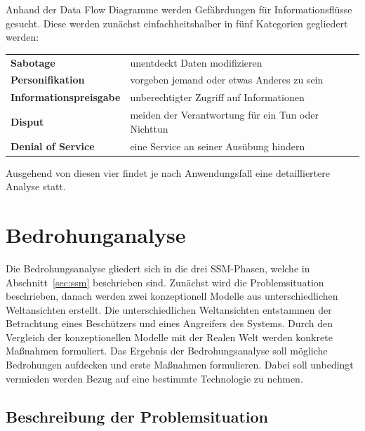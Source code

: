 \documentclass[11pt,a4paper]{report}
\begin{document}
Anhand der Data Flow Diagramme werden Gefährdungen für Informationsflüsse gesucht. Diese werden zunächst einfachheitshalber in fünf Kategorien gegliedert werden:

\begin{table}[h] %
\begin{tabularx}{\linewidth}{@{}lX@{}}
\textbf{Sabotage} & unentdeckt Daten modifizieren\\
\textbf{Personifikation} & vorgeben jemand oder etwas Anderes zu sein\\
\textbf{Informationspreisgabe} & unberechtigter Zugriff auf Informationen\\
\textbf{Disput} & meiden der Verantwortung für ein Tun oder Nichttun\\
\textbf{Denial of Service} & eine Service an seiner Ausübung hindern\\
\end{tabularx}
\end{table}

Ausgehend von diesen vier findet je nach Anwendungsfall eine detailliertere Analyse statt.

\chapter{Bedrohunganalyse} \label{chap:threat_analysis}

Die Bedrohungsanalyse gliedert sich in die drei SSM-Phasen, welche in Abschnitt~\ref{sec:ssm} beschrieben sind. Zunächst wird die Problemsituation beschrieben, danach werden zwei konzeptionell Modelle aus unterschiedlichen Weltansichten erstellt. Die unterschiedlichen Weltansichten entstammen der Betrachtung eines Beschützers und eines Angreifers des Systems. Durch den Vergleich der konzeptionellen Modelle mit der Realen Welt werden konkrete Maßnahmen formuliert. Das Ergebnis der Bedrohungsanalyse soll mögliche Bedrohungen aufdecken und erste Maßnahmen formulieren. Dabei soll unbedingt vermieden werden Bezug auf eine bestimmte Technologie zu nehmen.

\section{Beschreibung der Problemsituation} \label{sec:problem_situation}
\end{document}
